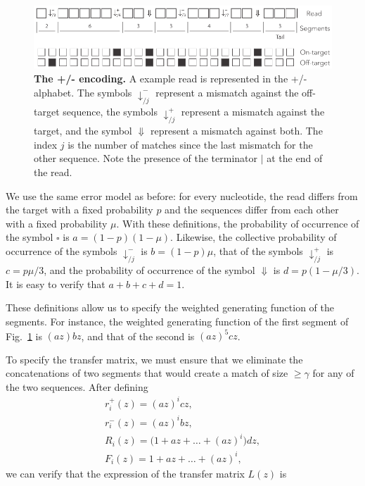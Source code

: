 \documentclass{article}
\begin{document}
\begin{figure}[h]
\centering
\includegraphics[scale=0.85]{sketch_dual.pdf}
\caption{\textbf{The +/- encoding.}
A example read is represented in the +/- alphabet. The symbols
$\downarrow_{/j}^-$ represent a mismatch against the off-target sequence,
the symbols $\downarrow_{/j}^+$ represent a mismatch against the target,
and the symbol $\Downarrow$ represent a mismatch against both. The index
$j$ is the number of matches since the last mismatch for the other
sequence. Note the presence of the terminator $|$ at the end of the read.
}
\label{fig:dual}
\end{figure}

We use the same error model as before: for every nucleotide, the read
differs from the target with a fixed probability $p$ and the sequences
differ from each other with a fixed probability $\mu$. With these
definitions, the probability of occurrence of the symbol $\square$ is $a =
(1-p)(1-\mu)$. Likewise, the collective probability of occurrence of the
symbols $\downarrow_{/j}^-$ is $b = (1-p)\mu$, that of the symbols
$\downarrow_{/j}^+$ is $c = p\mu/3$, and the probability of occurrence of
the symbol $\Downarrow$ is $d = p(1-\mu/3)$. It is easy to verify that
$a+b+c+d=1$.

These definitions allow us to specify the weighted generating function of
the segments. For instance, the weighted generating function of the
first segment of Fig.~\ref{fig:dual} is $(az)bz$, and that of the second is
$(az)^5cz$.

To specify the transfer matrix, we must ensure that we eliminate
the concatenations of two segments that would create a match of size $\geq
\gamma$ for any of the two sequences. After defining
\begin{equation*}
\begin{gathered}
r_i^+(z) = (az)^icz, \\
r_i^-(z) = (az)^ibz, \\
R_i(z) = \big( 1 + az + \ldots + (az)^i \big)dz, \\
F_i(z) = 1 + az + \ldots + (az)^i,
\end{gathered}
\end{equation*}
we can verify that the expression of the transfer matrix $L(z)$ is
\end{document}
